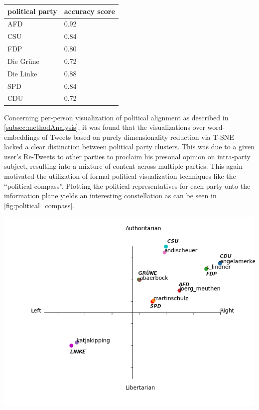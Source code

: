 \documentclass[10pt, oneside]{article}
\newenvironment{Figure}
	{\par\medskip\noindent\minipage{\linewidth}}
	{\endminipage\par\medskip}
\begin{document}
\begin{multicols}{2}
\begin{center}
	\begin{tabular}{|l|l|}
	\hline
	\textbf{political party} & \textbf{accuracy score} \\ \hline
	AFD & 0.92 \\
	CSU & 0.84 \\
	FDP & 0.80 \\
	Die Grüne & 0.72 \\
	Die Linke & 0.88 \\
	SPD & 0.84 \\
	CDU & 0.72 \\
	\hline
	\end{tabular}
	\label{tbl:majorityVotingAccuracyScores}
\end{center}

Concerning per-person visualization of political alignment as described in \autoref{subsec:methodAnalysis}, it was found that the visualizations over word-embeddings of Tweets based on purely dimensionality reduction via T-SNE lacked a clear distinction between political party clusters. This was due to a given user's Re-Tweets to other parties to proclaim his presonal opinion on intra-party subject, resulting into a mixture of content across multiple parties.
This again motivated the utilization of formal political visualization techniques like the ``political compass''. Plotting the political representatives for each party onto the information plane yields an interesting constellation as can be seen in \autoref{fig:political_compass}.

\begin{Figure}
	\centering
	\includegraphics[width=\linewidth]{images/Political_Compass-final.png}
	\label{fig:political_compass}
\end{Figure}


\end{multicols}
\end{document}
